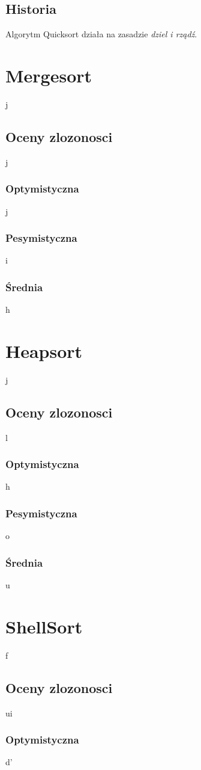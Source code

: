 \subsection{Historia}
Algorytm Quicksort działa na zasadzie \textit{dziel i rządź}.
\section{Mergesort}
j
\subsection{Oceny zlozonosci}
j
\subsubsection{Optymistyczna}
j
\subsubsection{Pesymistyczna}
i
\subsubsection{Średnia}
h
\section{Heapsort}
j
\subsection{Oceny zlozonosci}
l
\subsubsection{Optymistyczna}
h
\subsubsection{Pesymistyczna}
o
\subsubsection{Średnia}
u
\section{ShellSort}
f
\subsection{Oceny zlozonosci}
ui
\subsubsection{Optymistyczna}
d'
